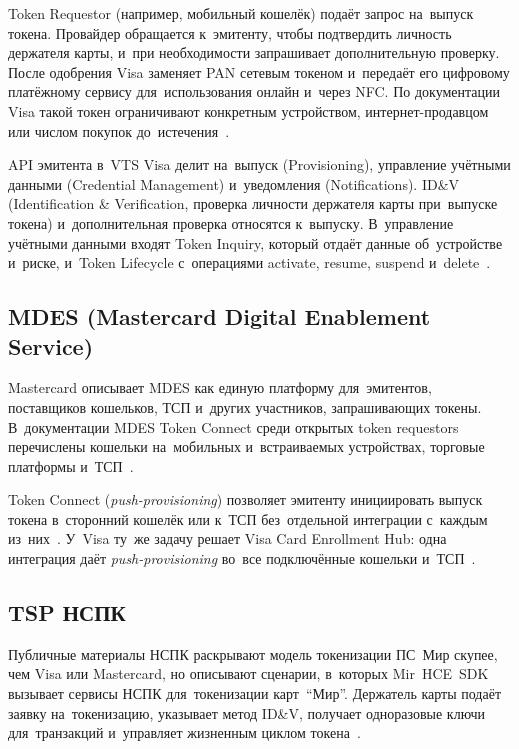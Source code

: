 Token Requestor (например, мобильный кошелёк) подаёт запрос на~выпуск токена.
Провайдер обращается к~эмитенту, чтобы подтвердить личность держателя карты,
и~при необходимости запрашивает дополнительную проверку. После одобрения Visa
заменяет PAN сетевым токеном и~передаёт его цифровому платёжному сервису
для~использования онлайн и~через NFC. По документации Visa такой токен
ограничивают конкретным устройством, интернет-продавцом или числом покупок
до~истечения~\cite{visa-vts}.

API эмитента в~VTS Visa делит на~выпуск (Provisioning), управление
учётными данными (Credential Management) и~уведомления (Notifications). ID\&V
(Identification \& Verification, проверка личности держателя карты при~выпуске
токена) и~дополнительная проверка относятся к~выпуску. В~управление учётными
данными входят Token Inquiry, который отдаёт данные об~устройстве и~риске,
и~Token Lifecycle с~операциями activate, resume, suspend и~delete~\cite{visa-vts}.

\subsection*{MDES (Mastercard Digital Enablement Service)}

Mastercard описывает MDES как единую платформу для~эмитентов, поставщиков
кошельков, ТСП и~других участников, запрашивающих токены. В~документации MDES
Token Connect среди открытых token requestors перечислены кошельки на~мобильных
и~встраиваемых устройствах, торговые платформы
и~ТСП~\cite{mc-mdes,mc-mdes-token-connect}.

Token Connect (\textit{push-provisioning}) позволяет эмитенту инициировать
выпуск токена в~сторонний кошелёк или к~ТСП без~отдельной интеграции
с~каждым из~них~\cite{mc-mdes-token-connect}. У~Visa ту~же задачу решает
Visa Card Enrollment Hub: одна интеграция даёт \textit{push-provisioning}
во~все подключённые кошельки и~ТСП~\cite{visa-card-enrollment-hub}.

\subsection*{TSP НСПК}

Публичные материалы НСПК раскрывают модель токенизации ПС~Мир скупее, чем Visa или
Mastercard, но описывают сценарии, в~которых Mir~HCE~SDK вызывает сервисы НСПК
для~токенизации карт~\enquote{Мир}. Держатель карты подаёт заявку на~токенизацию,
указывает метод ID\&V, получает одноразовые ключи для~транзакций и~управляет
жизненным циклом токена~\cite{nspk-tsp}.


